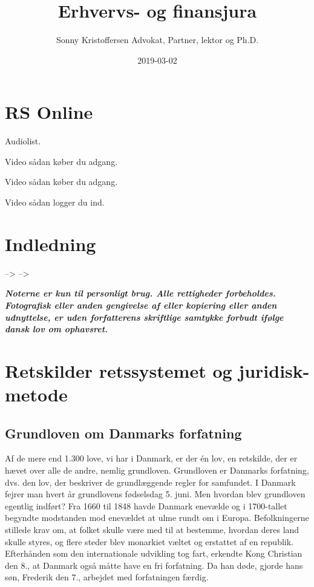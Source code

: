 \documentclass[]{book}
\title{Erhvervs- og finansjura}
\author{Sonny Kristoffersen Advokat, Partner, lektor og Ph.D.}
\date{2019-03-02}
\begin{document}
\maketitle

{
\setcounter{tocdepth}{1}
\tableofcontents
}
\hypertarget{section}{%
\chapter*{}\label{section}}

\hypertarget{rs-online}{%
\chapter{RS Online}\label{rs-online}}

Audiolist.

Video sådan køber du adgang.

Video sådan køber du adgang.

Video sådan logger du ind.

\hypertarget{indledning}{%
\chapter{Indledning}\label{indledning}}

--\textgreater{}
 --\textgreater{}

\textbf{\emph{Noterne er kun til personligt brug. Alle rettigheder forbeholdes. Fotografisk eller anden gengivelse af eller kopiering eller anden udnyttelse, er uden forfatterens skriftlige samtykke forbudt ifølge dansk lov om ophavsret.}}

\hypertarget{retskilder-retssystemet-og-juridisk-metode}{%
\chapter{Retskilder retssystemet og juridisk-metode}\label{retskilder-retssystemet-og-juridisk-metode}}

\hypertarget{grundloven-om-danmarks-forfatning}{%
\section{Grundloven om Danmarks forfatning}\label{grundloven-om-danmarks-forfatning}}

Af de mere end 1.300 love, vi har i Danmark, er der én lov, en retskilde, der er hævet over alle de andre, nemlig grundloven. Grundloven er Danmarks forfatning, dvs. den lov, der beskriver de grundlæggende regler for samfundet. I Danmark fejrer man hvert år grundlovens fødselsdag 5. juni. Men hvordan blev grundloven egentlig indført?
Fra 1660 til 1848 havde Danmark enevælde og i 1700-tallet begyndte modstanden mod enevældet at ulme rundt om i Europa.
Befolkningerne stillede krav om, at folket skulle være med til at bestemme, hvordan deres land skulle styres, og flere steder blev monarkiet væltet og erstattet af en republik.
Efterhånden som den internationale udvikling tog fart, erkendte Kong Christian den 8., at Danmark også måtte have en fri forfatning. Da han døde, gjorde hans søn, Frederik den 7., arbejdet med forfatningen færdig.
\end{document}
